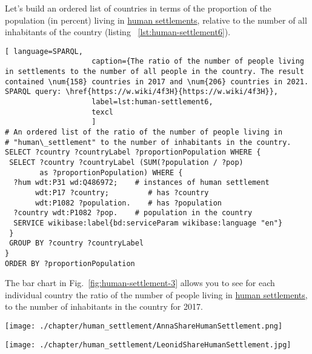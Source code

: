 Let's build an ordered list of countries in terms of the proportion of the population (in percent) living in \href{http://www.wikidata.org/entity/Q486972} {human settlements}, relative to the number of all inhabitants of the country (listing ~\ref{lst:human-settlement6}).

\begin{lstlisting}[ language=SPARQL, 
                    caption={The ratio of the number of people living in settlements to the number of all people in the country. The result contained \num{158} countries in 2017 and \num{206} countries in 2021. SPARQL query: \href{https://w.wiki/4f3H}{https://w.wiki/4f3H}},
                    label=lst:human-settlement6,
                    texcl 
                    ]
# An ordered list of the ratio of the number of people living in 
# "human\_settlement" to the number of inhabitants in the country.
SELECT ?country ?countryLabel ?proportionPopulation WHERE {
 SELECT ?country ?countryLabel (SUM(?population / ?pop) 
        as ?proportionPopulation) WHERE {
  ?hum wdt:P31 wd:Q486972;    # instances of human settlement  
       wdt:P17 ?country;         # has ?country 
       wdt:P1082 ?population.    # has ?population
  ?country wdt:P1082 ?pop.    # population in the country
  SERVICE wikibase:label{bd:serviceParam wikibase:language "en"}
 }
 GROUP BY ?country ?countryLabel
}
ORDER BY ?proportionPopulation
\end{lstlisting}%

The bar chart in Fig.~\ref{fig:human-settlement-3} allows you to see for each individual country the ratio of the number of people living in \href{http://www.wikidata.org/entity/Q486972}{human settlements}, to the number of inhabitants in the country for 2017.

\begin{figure*}
    \texttt{[image: ./chapter/human\_settlement/AnnaShareHumanSettlement.png]}
	\label{fig:human-settlement-3}
	\caption[Chart of the country's population share, 2017.]{Diagram of the share of the country's population living in ``human settlements'' for 2017. SPARQL query: \href{https://w.wiki/4f3H}{https://w.wiki/4f3H}}%
\end{figure*} 

\begin{figure*}
    \texttt{[image: ./chapter/human\_settlement/LeonidShareHumanSettlement.jpg]}
	\label{fig:human-settlement-4}
	\caption[Chart of the country's population share, 2021.]{Diagram of the share of the country's population living in ``human settlements'' for 2021. Countries with a population of more than 5 million people were selected. SPARQL query: \href{https://w.wiki/4f3K}{https://w.wiki/4f3K}}%
\end{figure*} 


